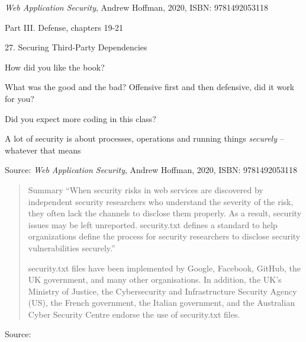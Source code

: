 \documentclass[Screen16to9,17pt]{foils}
\begin{document}
\emph{Web Application Security}, Andrew Hoffman, 2020, ISBN: 9781492053118

\begin{list1}
\item Part III. Defense, chapters 19-21
\item 27. Securing Third-Party Dependencies
\end{list1}

How did you like the book?

What was the good and the bad? Offensive first and then defensive, did it work for you?

Did you expect more coding in this class?

A lot of security is about processes, operations and running things \emph{securely} -- whatever that means



\begin{quote}

\end{quote}

Source: \emph{Web Application Security}, Andrew Hoffman, 2020, ISBN: 9781492053118








\begin{quote}
Summary
“When security risks in web services are discovered by independent security researchers who understand the severity of the risk, they often lack the channels to disclose them properly. As a result, security issues may be left unreported. security.txt defines a standard to help organizations define the process for security researchers to disclose security vulnerabilities securely.”


security.txt files have been implemented by Google, Facebook, GitHub, the UK government, and many other organisations. In addition, the UK’s Ministry of Justice, the Cybersecurity and Infrastructure Security Agency (US), the French government, the Italian government, and the Australian Cyber Security Centre endorse the use of security.txt files.
\end{quote}

Source: 
\end{document}
